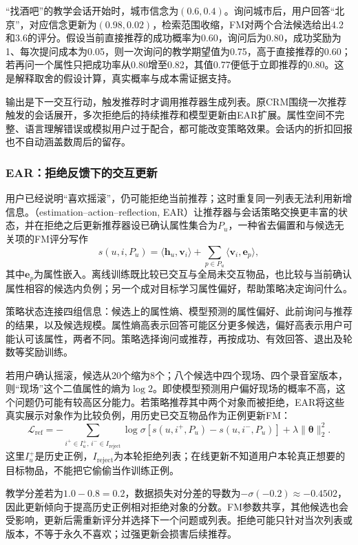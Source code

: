 “找酒吧”的教学会话开始时，城市信念为$(0.6,0.4)$。询问城市后，用户回答“北京”，对应信念更新为$(0.98,0.02)$，检索范围收缩，FM对两个合法候选给出4.2和3.6的评分。假设当前直接推荐的成功概率为0.60，询问后为0.80，成功奖励为1、每次提问成本为0.05，则一次询问的教学期望值为0.75，高于直接推荐的0.60；若再问一个属性只把成功率从0.80增至0.82，其值0.77便低于立即推荐的0.80。这是解释取舍的假设计算，真实概率与成本需证据支持。

输出是下一交互行动，触发推荐时才调用推荐器生成列表。原CRM围绕一次推荐触发的会话展开，多次拒绝后的持续推荐和模型更新由EAR扩展。属性空间不完整、语言理解错误或模拟用户过于配合，都可能改变策略效果。会话内的折扣回报也不自动涵盖数周后的留存。

\subsubsection{EAR：拒绝反馈下的交互更新}
\label{sec:rs-ear}

用户已经说明“喜欢摇滚”，仍可能拒绝当前推荐；这时重复同一列表无法利用新增信息。（estimation–action–reflection, EAR）让推荐器与会话策略交换更丰富的状态，并在拒绝之后更新推荐器设已确认属性集合为$P_u$，一种省去偏置和与候选无关项的FM评分写作
\[
 s(u,i,P_u)=\langle\bm h_u,\bm v_i\rangle
           +\sum_{p\in P_u}\langle\bm v_i,\bm e_p\rangle,
\]
其中$\bm e_p$为属性嵌入。离线训练既比较已交互与全局未交互物品，也比较与当前确认属性相容的候选内负例；另一个成对目标学习属性偏好，帮助策略决定询问什么。

策略状态连接四组信息：候选上的属性熵、模型预测的属性偏好、此前询问与推荐的结果，以及候选规模。属性熵高表示回答可能区分更多候选，偏好高表示用户可能认可该属性，两者不同。策略选择询问或推荐，再按成功、有效回答、退出及轮数等奖励训练。

若用户确认摇滚，候选从20个缩为8个；八个候选中四个现场、四个录音室版本，则“现场”这个二值属性的熵为$\log2$。即使模型预测用户偏好现场的概率不高，这个问题仍可能有较高区分能力。若策略推荐其中两个对象而被拒绝，EAR将这些真实展示对象作为比较负例，用历史已交互物品作为正例更新FM：
\[
 \mathcal L_{\mathrm{ref}}
 =-\sum_{i^+\in I_u^+,\,i^-\in I_{\mathrm{reject}}}
 \log\sigma\!\left[s(u,i^+,P_u)-s(u,i^-,P_u)\right]
 +\lambda\lVert\bm\theta\rVert_2^2.
\]
这里$I_u^+$是历史正例，$I_{\mathrm{reject}}$为本轮拒绝列表；在线更新不知道用户本轮真正想要的目标物品，不能把它偷偷当作训练正例。

教学分差若为$1.0-0.8=0.2$，数据损失对分差的导数为$-\sigma(-0.2)\approx-0.4502$，因此更新倾向于提高历史正例相对拒绝对象的分数。FM参数共享，其他候选也会受影响，更新后需重新评分并选择下一个问题或列表。拒绝可能只针对当次列表或版本，不等于永久不喜欢；过强更新会损害后续推荐。

